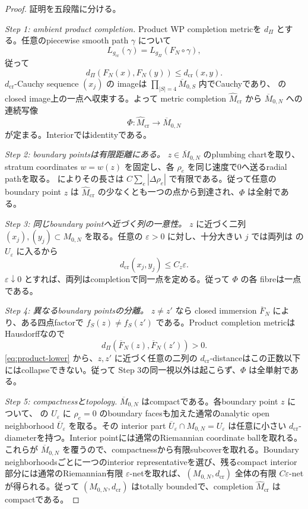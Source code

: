 \documentclass[11pt,a4paper]{ltjsarticle}
\newcommand{\ov}{\overline}
\theoremstyle{plain}
\theoremstyle{definition}
\theoremstyle{remark}
\begin{document}
\begin{proof}
証明を五段階に分ける。

\smallskip
\noindent\textit{Step 1: ambient product completion.}
Product WP completion metricを $d_\Pi$ とする。任意のpiecewise smooth path $\gamma$ について
\[
 L_{g_{\mathrm{cr}}}(\gamma)=L_{g_\Pi}(F_N\circ\gamma),
\]
従って
\begin{equation}
\label{eq:product-lower}
 d_\Pi(F_N(x),F_N(y))\le d_{\mathrm{cr}}(x,y).
\end{equation}
$d_{\mathrm{cr}}$-Cauchy sequence $(x_j)$ の imageは $\prod_{|S|=4}\ov M_{0,S}$ 内でCauchyであり、 のclosed image上の一点へ収束する。よって metric completion $\widehat M_{\mathrm{cr}}$ から $\ov M_{0,N}$ への連続写像
\[
 \Phi:\widehat M_{\mathrm{cr}}\longrightarrow\ov M_{0,N}
\]
が定まる。Interiorではidentityである。

\smallskip
\noindent\textit{Step 2: boundary pointsは有限距離にある。}
$z\in\ov M_{0,N}$ のplumbing chartを取り、stratum coordinates $w=w(z)$ を固定し、各 $\rho_e$ を同じ速度で0へ送るradial pathを取る。 によりその長さは $C\sum_e|\Delta\rho_e|$ で有限である。従って任意のboundary point $z$ は $\widehat M_{\mathrm{cr}}$ の少なくとも一つの点から到達され、$\Phi$ は全射である。

\smallskip
\noindent\textit{Step 3: 同じboundary pointへ近づく列の一意性。}
$z$ に近づく二列 $(x_j),(y_j)\subset M_{0,N}$ を取る。任意の $\varepsilon>0$ に対し、十分大きい $j$ では両列は  の $U_\varepsilon$ に入るから
\[
 d_{\mathrm{cr}}(x_j,y_j)\le C_z\varepsilon.
\]
$\varepsilon\downarrow0$ とすれば、両列はcompletionで同一点を定める。従って $\Phi$ の各 fibreは一点である。

\smallskip
\noindent\textit{Step 4: 異なるboundary pointsの分離。}
$z\ne z'$ なら closed immersion $\ov F_N$ により、ある四点factorで $f_S(z)\ne f_S(z')$ である。Product completion metricはHausdorffなので
\[
 d_\Pi(\ov F_N(z),\ov F_N(z'))>0.
\]
\eqref{eq:product-lower} から、$z,z'$ に近づく任意の二列の $d_{\mathrm{cr}}$-distanceはこの正数以下にはcollapseできない。従って Step 3の同一視以外は起こらず、$\Phi$ は全単射である。

\smallskip
\noindent\textit{Step 5: compactnessとtopology.}
$\ov M_{0,N}$ はcompactである。各boundary point $z$ について、 の $U_\varepsilon$ に $\rho_e=0$ のboundary facesも加えた通常のanalytic open neighborhood $\ov U_\varepsilon$ を取る。その interior part $\ov U_\varepsilon\cap M_{0,N}=U_\varepsilon$ は任意に小さい $d_{\mathrm{cr}}$-diameterを持つ。Interior pointには通常のRiemannian coordinate ballを取れる。これらが $\ov M_{0,N}$ を覆うので、compactnessから有限subcoverを取れる。Boundary neighborhoodsごとに一つのinterior representativeを選び、残るcompact interior部分には通常のRiemannian有限 $\varepsilon$-netを取れば、$(M_{0,N},d_{\mathrm{cr}})$ 全体の有限 $C\varepsilon$-netが得られる。従って $(M_{0,N},d_{\mathrm{cr}})$ はtotally boundedで、completion $\widehat M_{\mathrm{cr}}$ はcompactである。


\end{proof}
\end{document}
